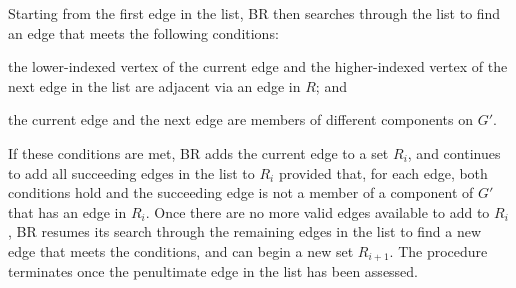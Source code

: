 \documentclass[oribibl]{llncs}
\begin{document}
Starting from the first edge in the list, BR then searches through the list to find an edge that meets the following conditions: 
\begin{enumerate*}[label={(\alph*)}]
	\item the lower-indexed vertex of the current edge and the higher-indexed vertex of the next edge in the list are adjacent via an edge in $R$; and
	\item the current edge and the next edge are members of different components on $G'$.
\end{enumerate*}
If these conditions are met, BR adds the current edge to a set $R_i$, and continues to add all succeeding edges in the list to $R_i$ provided that, for each edge, both conditions hold and the succeeding edge is not a member of a component of $G'$ that has an edge in $R_i$. Once there are no more valid edges available to add to $R_i$, BR resumes its search through the remaining edges in the list to find a new edge that meets the conditions, and can begin a new set $R_{i+1}$. The procedure terminates once the penultimate edge in the list has been assessed.
\end{document}
